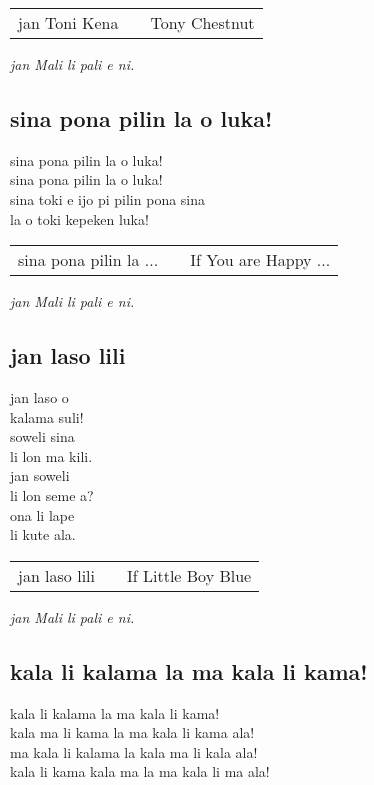 \begin{supertabular}{p{5,5cm}|ll}
    jan Toni Kena &  & Tony Chestnut \\
\end{supertabular}

\textit{jan Mali li pali e ni. \cite{www:astrodonunt:01}}

\subsection{sina pona pilin la o luka!}
sina pona pilin la o luka!  \\
sina pona pilin la o luka!  \\
sina toki e ijo pi pilin pona sina  \\
la o toki kepeken luka!

\begin{supertabular}{p{5,5cm}|ll}
    sina pona pilin la ... &  & If You are Happy ... \\
\end{supertabular}

\textit{jan Mali li pali e ni. \cite{www:astrodonunt:01}}

\subsection{jan laso lili}
jan laso o  \\
kalama suli!  \\
soweli sina  \\
li lon ma kili.  \\
jan soweli  \\
li lon seme a?  \\
ona li lape  \\
li kute ala.  \\

\begin{supertabular}{p{5,5cm}|ll}
    jan laso lili &  & If Little Boy Blue \\
\end{supertabular}

\textit{jan Mali li pali e ni. \cite{www:astrodonunt:01}}

\subsection{kala li kalama la ma kala li kama!}
kala li kalama la ma kala li kama!           \\
kala ma li kama la ma kala li kama ala!      \\
ma kala li kalama la kala ma li kala ala!    \\
kala li kama kala ma la ma kala li ma ala!

